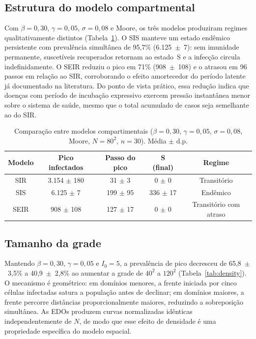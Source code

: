\documentclass[fleqn,10pt]{wlscirep}
\begin{document}
\subsection*{Estrutura do modelo compartmental}

Com $\beta = 0{,}30$, $\gamma = 0{,}05$, $\sigma = 0{,}08$ e Moore, os tr\^{e}s modelos produziram regimes qualitativamente distintos (Tabela~\ref{tab:models}). O SIS manteve um estado end\^{e}mico persistente com preval\^{e}ncia simult\^{a}nea de 95{,}7\% (6.125~$\pm$~7): sem imunidade permanente, suscet\'{i}veis recuperados retornam ao estado~S e a infec\c{c}\~{a}o circula indefinidamente. O SEIR reduziu o pico em 71\% (908~$\pm$~108) e o atrasou em 96 passos em rela\c{c}\~{a}o ao SIR, corroborando o efeito amortecedor do per\'{i}odo latente j\'{a} documentado na literatura\cite{Beauchemin:2005,White:2007}. Do ponto de vista pr\'{a}tico, essa redu\c{c}\~{a}o indica que doen\c{c}as com per\'{i}odo de incuba\c{c}\~{a}o expressivo exercem press\~{a}o instant\^{a}nea menor sobre o sistema de sa\'{u}de, mesmo que o total acumulado de casos seja semelhante ao do SIR.

\begin{table}[ht]
\centering
\caption{\label{tab:models}Compara\c{c}\~{a}o entre modelos compartimentais ($\beta = 0{,}30$, $\gamma = 0{,}05$, $\sigma = 0{,}08$, Moore, $N = 80^2$, $n = 30$). M\'{e}dia $\pm$ d.p.}
\begin{tabular}{ccccc}
\toprule
Modelo & Pico infectados & Passo do pico & S (final) & Regime \\
\midrule
SIR  & 3.154 $\pm$ 180 & 31 $\pm$ 3   & 0 $\pm$ 0    & Transit\'{o}rio \\
SIS  & 6.125 $\pm$ 7   & 199 $\pm$ 95 & 336 $\pm$ 17 & End\^{e}mico \\
SEIR & 908 $\pm$ 108   & 127 $\pm$ 17 & 0 $\pm$ 0    & Transit\'{o}rio com atraso \\
\bottomrule
\end{tabular}
\end{table}

\subsection*{Tamanho da grade}

Mantendo $\beta = 0{,}30$, $\gamma = 0{,}05$ e $I_0 = 5$, a preval\^{e}ncia de pico decresceu de 65{,}8~$\pm$~3{,}5\% a 40{,}9~$\pm$~2{,}8\% ao aumentar a grade de $40^2$ a $120^2$ (Tabela~\ref{tab:density}). O mecanismo \'{e} geom\'{e}trico: em dom\'{i}nios menores, a frente iniciada por cinco c\'{e}lulas infectadas satura a popula\c{c}\~{a}o antes de declinar; em dom\'{i}nios maiores, a frente percorre dist\^{a}ncias proporcionalmente maiores, reduzindo a sobreposi\c{c}\~{a}o simult\^{a}nea. As EDOs produzem curvas normalizadas id\^{e}nticas independentemente de $N$, de modo que esse efeito de densidade \'{e} uma propriedade espec\'{i}fica do modelo espacial.
\end{document}
